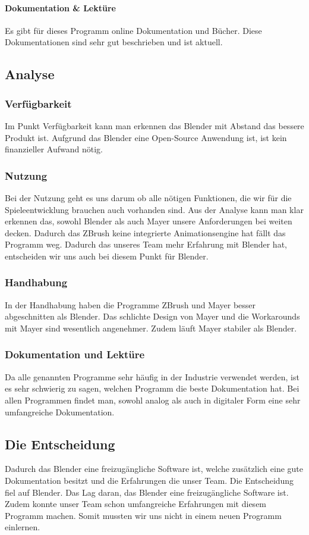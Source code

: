 \paragraph{Dokumentation \& Lektüre}
Es gibt für dieses Programm online Dokumentation und Bücher. Diese Dokumentationen sind sehr gut beschrieben und ist aktuell.

\pagebreak

\subsection{Analyse}
\subsubsection{Verfügbarkeit}
Im Punkt Verfügbarkeit kann man erkennen das Blender mit Abstand das bessere Produkt ist. Aufgrund das Blender eine Open-Source Anwendung ist, ist kein finanzieller Aufwand nötig.

\subsubsection{Nutzung}
Bei der Nutzung geht es uns darum ob alle nötigen Funktionen, die wir für die Spieleentwicklung brauchen auch vorhanden sind. Aus der Analyse kann man klar erkennen das, sowohl Blender als auch Mayer unsere Anforderungen bei weiten decken. Dadurch das ZBrush keine integrierte Animationsengine hat fällt das Programm weg. Dadurch das unseres Team mehr Erfahrung mit Blender hat, entscheiden wir uns auch bei diesem Punkt für Blender.

\subsubsection{Handhabung}
In der Handhabung haben die Programme ZBrush und Mayer besser abgeschnitten als Blender. Das schlichte Design von Mayer und die Workarounds mit Mayer sind wesentlich angenehmer. Zudem läuft Mayer stabiler als Blender.

\subsubsection{Dokumentation und Lektüre}
Da alle genannten Programme sehr häufig in der Industrie verwendet werden, ist es sehr schwierig zu sagen, welchen Programm die beste Dokumentation hat. Bei allen Programmen findet man, sowohl analog als auch in digitaler Form eine sehr umfangreiche Dokumentation.

\subsection{Die Entscheidung}
Dadurch das Blender eine freizugängliche Software ist, welche zusätzlich eine gute Dokumentation besitzt und die Erfahrungen die unser Team.
Die Entscheidung fiel auf Blender. Das Lag daran, das Blender eine freizugängliche Software ist. Zudem konnte unser Team schon umfangreiche Erfahrungen mit diesem Programm machen. Somit mussten wir uns nicht in einem neuen Programm einlernen.
